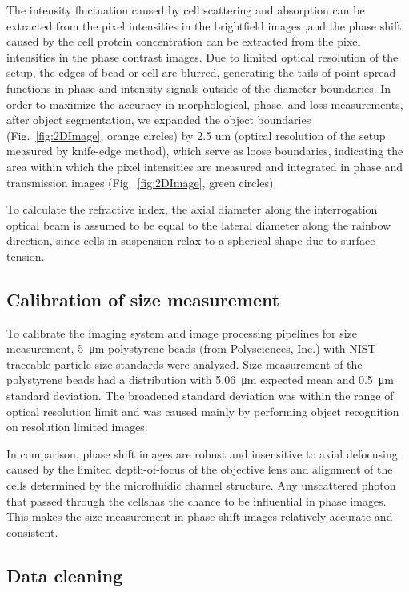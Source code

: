 \documentclass[aps,pra,reprint,superscriptaddress]{revtex4-1}
\begin{document}
The intensity fluctuation caused by cell scattering and absorption can be extracted from the pixel intensities in the brightfield images ,and the phase shift caused by the cell protein concentration can be extracted from the pixel intensities in the phase contrast images. Due to limited optical resolution of the setup, the edges of bead or cell are blurred, generating the tails of point spread functions in phase and intensity signals outside of the diameter boundaries. In order to maximize the accuracy in morphological, phase, and loss measurements, after object segmentation, we expanded the object boundaries (Fig.~\ref{fig:2DImage}, orange circles) by 2.5 um (optical resolution of the setup measured by knife-edge method), which serve as loose boundaries, indicating the area within which the pixel intensities are measured and integrated in phase and transmission images (Fig.~\ref{fig:2DImage}, green circles).

To calculate the refractive index, the axial diameter along the interrogation optical beam is assumed to be equal to the lateral diameter along the rainbow direction, since cells in suspension relax to a spherical shape due to surface tension.

\subsection{Calibration of size measurement}

To calibrate the imaging system and image processing pipelines for size measurement, \SI{5}{\micro\meter} polystyrene beads (from Polysciences, Inc.) with NIST traceable particle size standards were analyzed. Size measurement of the polystyrene beads had a distribution with \SI{5.06}{\micro\meter} expected mean and \SI{0.5}{\micro\meter} standard deviation. The broadened standard deviation was within the range of optical resolution limit and was caused mainly by performing object recognition on resolution limited images.

In comparison, phase shift images are robust and insensitive to axial defocusing caused by the limited depth-of-focus of the objective lens and alignment of the cells determined by the microfluidic channel structure. Any unscattered photon that passed through the cellshas the chance to be influential in phase images. This makes the size measurement in phase shift images relatively accurate and consistent. 

\subsection{Data cleaning}
\end{document}
